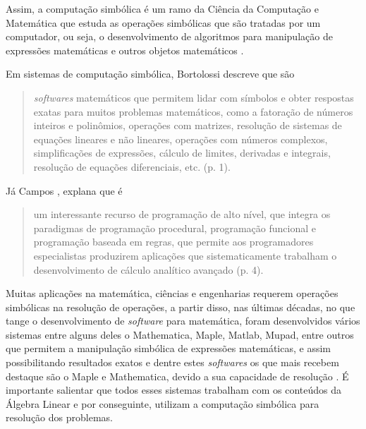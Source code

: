 Assim, a computação simbólica é um ramo da Ciência da Computação e Matemática que estuda as operações simbólicas que são tratadas por um computador, ou seja, o desenvolvimento de algoritmos para manipulação de expressões matemáticas e outros objetos matemáticos \cite{2005:Leandro}.

Em sistemas de computação simbólica, Bortolossi \cite{2012:Humberto} descreve que são
\begin{quote}
    \textit{softwares} matemáticos que permitem lidar com símbolos e obter respostas exatas para muitos problemas matemáticos, como a fatoração de números inteiros e polinômios, operações com matrizes, resolução de sistemas de equações lineares e não lineares, operações com números complexos, simplificações de expressões, cálculo de limites, derivadas e integrais, resolução de equações diferenciais, etc. (p. 1).
\end{quote}

Já Campos \cite{2015:Lidio}, explana que é
\begin{quote}
    um interessante recurso de programação de alto nível, que integra os paradigmas de programação procedural, programação funcional e programação baseada em regras, que permite aos programadores especialistas produzirem aplicações que sistematicamente trabalham o desenvolvimento de cálculo analítico avançado (p. 4).  
\end{quote}

Muitas aplicações na matemática, ciências e engenharias requerem operações simbólicas na resolução de operações, a partir disso, nas últimas décadas, no que tange o desenvolvimento de \textit{software} para matemática, foram desenvolvidos vários sistemas entre alguns deles o Mathematica, Maple, Matlab, Mupad, entre outros que permitem a manipulação simbólica de expressões matemáticas, e assim possibilitando resultados exatos e dentre estes \textit{softwares} os que mais recebem destaque são o Maple e Mathematica, devido a sua capacidade de resolução \cite{2007:Valesca}. É importante salientar que todos esses sistemas trabalham com os conteúdos da Álgebra Linear e por conseguinte, utilizam a computação simbólica para resolução dos problemas.

